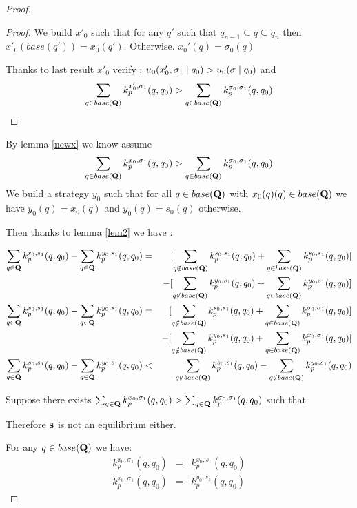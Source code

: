 \begin{proof}
\begin{proof}
We build $x'_0$ such that for any $q'$  such that $q_{n-1} \subseteq q \subseteq q_{n}$ then $x'_0(base(q')) = x_0(q')$. Otherwise. $x_0'(q) = \sigma_0(q)$ 

Thanks to last result $x'_0$ verify : $u_0(x_0',\sigma_1 \mid q_0) > u_0(\mathbf{\sigma} \mid q_0)$ and $$\sum_{q \in base(\mathbf{Q})} k^{x_0',\sigma_1}_p(q,q_0) >  \sum_{q \in base(\mathbf{Q})} k^{\sigma_0,\sigma_1}_p(q,q_0) $$


	\end{proof}
	
	By lemma \ref{newx} we know assume $$\sum_{q \in base(\mathbf{Q})} k^{x_0,\sigma_1}_p(q,q_0) >  \sum_{q \in base(\mathbf{Q})} k^{\sigma_0,\sigma_1}_p(q,q_0) $$
	We build a strategy $y_0$ such that for all $q \in base(\mathbf{Q})$ with $x_0(q)(q) \in base(\mathbf{Q})$ we have $y_0(q) = x_0(q)$ and $y_0(q) = s_0(q)$ otherwise.

	
	Then thanks to lemma \ref{lem2} we have :
	
	\begin{eqnarray*}
		\sum_{q \in \mathbf{Q}} k^{s_0,s_1}_p(q,q_0) - \sum_{q \in \mathbf{Q}} k^{y_0,s_1}_p(q,q_0) & = & [\sum_{q \notin base(\mathbf{Q})} k^{s_0,s_1}_p(q,q_0) + 	\sum_{q \in base(\mathbf{Q})} k^{s_0,s_1}_p(q,q_0)]\\
		 && - [\sum_{q \notin base(\mathbf{Q})} k^{y_0,s_1}_p(q,q_0) + \sum_{q \in base(\mathbf{Q})} k^{y_0,s_1}_p(q,q_0)]\\
		 \sum_{q \in \mathbf{Q}} k^{s_0,s_1}_p(q,q_0) - \sum_{q \in \mathbf{Q}} k^{y_0,s_1}_p(q,q_0) & = & [\sum_{q \notin base(\mathbf{Q})} k^{s_0,s_1}_p(q,q_0)  + \sum_{q \in base(\mathbf{Q})} k^{\sigma_0,\sigma_1}_p(q,q_0)	]\\
		 && - [ \sum_{q \notin base(\mathbf{Q})} k^{y_0,s_1}_p(q,q_0) + \sum_{q \in base(\mathbf{Q})} k^{x_0,\sigma_1}_p(q,q_0)]\\
		 \sum_{q \in \mathbf{Q}} k^{s_0,s_1}_p(q,q_0) - \sum_{q \in \mathbf{Q}} k^{y_0,s_1}_p(q,q_0) & < & \sum_{q \notin base(\mathbf{Q})} k^{s_0,s_1}_p(q,q_0)   -  \sum_{q \notin base(\mathbf{Q})} k^{y_0,s_1}_p(q,q_0) \\
	\end{eqnarray*}

\begin{mylem}
	Suppose there exists $\sum_{q \in \mathbf{Q}} k^{x_0,\sigma_1}_p(q,q_0) >  \sum_{q \in \mathbf{Q}} k^{\sigma_0,\sigma_1}_p(q,q_0)$ such that 
\end{mylem}


Therefore $\mathbf{s}$ is not an equilibrium either.
	
	\iffalse
	
	

	For any $q \in base(\mathbf{Q})$ we have: 
	\begin{eqnarray*}
		k^{x_0,\sigma_1}_p(q,q_0) & =  &k^{x_0,s_1}_p(q,q_0) \\
		k^{x_0,\sigma_1}_p(q,q_0) & =  &k^{y_0,s_1}_p(q,q_0)
	\end{eqnarray*}
	

\end{proof}
